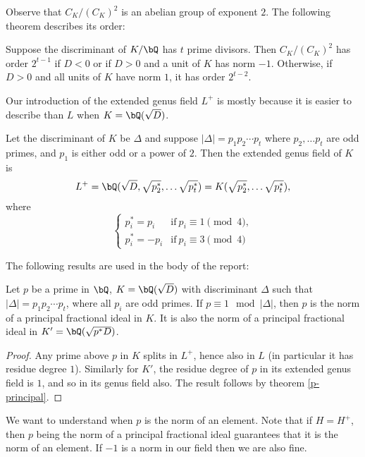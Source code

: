 Observe that $C_K / (C_K)^2$ is an abelian group of exponent $2$. The following theorem describes its order:

\begin{thm} 
Suppose the discriminant of $K / \bQ$ has $t$ prime divisors. Then $C_K / (C_K)^2$ has order $2^{t-1}$ if $D < 0$ or if $D > 0$ and a unit of $K$ has norm $-1$. Otherwise, if $D > 0$ and all units of $K$ have norm $1$, it has order $2^{t - 2}$.
\end{thm} 

Our introduction of the extended genus field $L^{+}$ is mostly because it is easier to describe than $L$ when $K = \bQ(\sqrt{D})$.

\begin{thm} 
Let the discriminant of $K$ be $\Delta$ and suppose $|\Delta| = p_1 p_2 \cdots p_t$ where $p_2, \ldots p_t$ are odd primes, and $p_1$ is either odd or a power of $2$. Then the extended genus field of $K$ is 
    \[ L^{+} = \bQ(\sqrt{D}, \sqrt{p_2^*}, \ldots \sqrt{p_t^*}) = K(\sqrt{p_2^*}, \ldots \sqrt{p_t^*}), \] 
where 
\[ \begin{cases}
    p_i^* = p_i & \mathrm{if }\ p_i \equiv 1 \pmod 4, \\
    p_i^* = -p_i & \mathrm{if }\ p_i \equiv 3 \pmod 4
\end{cases}\]
\end{thm} 

\vspace{2em}

The following results are used in the body of the report:

\begin{cor}\label{p-one-mod-disc}
    Let $p$ be a prime in $\bQ$, $K = \bQ(\sqrt{D})$ with discriminant $\Delta$ such that $|\Delta| = p_1 p_2 \cdots p_t$, where all $p_i$ are odd primes. If $p \equiv 1 \mod {|\Delta|}$, then $p$ is the norm of a principal fractional ideal in $K$. It is also the norm of a principal fractional ideal in $K' = \bQ({\sqrt{p^*D}})$.
\end{cor}

\begin{proof}
    Any prime above $p$ in $K$ splits in $L^{+}$, hence also in $L$ (in particular it has residue degree $1$). Similarly for $K'$, the residue degree of $p$ in its extended genus field is $1$, and so in its genus field also. The result follows by theorem \ref{p-principal}.
\end{proof}

We want to understand when $p$ is the norm of an element. Note that if $H = H^{+}$, then $p$ being the norm of a principal fractional ideal guarantees that it is the norm of an element. If $-1$ is a norm in our field then we are also fine. 

